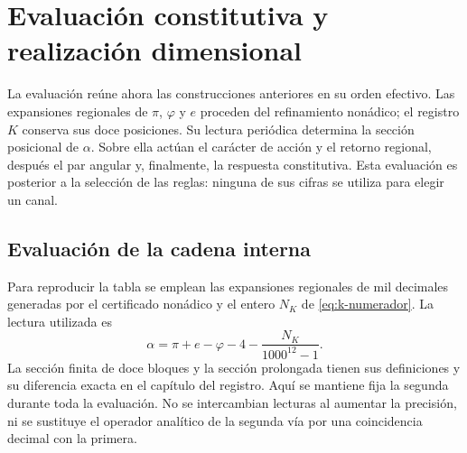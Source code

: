 \section{Evaluación constitutiva y realización dimensional}
\label{iii:sec:evaluacion}

La evaluación reúne ahora las construcciones anteriores en su orden efectivo.
Las expansiones regionales de $\pi$, $\varphi$ y $e$ proceden del refinamiento
nonádico; el registro $K$ conserva sus doce posiciones. Su lectura periódica
determina la sección posicional de $\alpha$. Sobre ella actúan el carácter
de acción y el retorno regional, después el par angular y, finalmente, la
respuesta constitutiva. Esta evaluación es posterior a la selección de las
reglas: ninguna de sus cifras se utiliza para elegir un canal.

\subsection{Evaluación de la cadena interna}

Para reproducir la tabla se emplean las expansiones regionales de mil
decimales generadas por el certificado nonádico y el entero $N_K$ de
\eqref{eq:k-numerador}. La lectura utilizada es
\[
 \alpha=\pi+e-\varphi-4-\frac{N_K}{1000^{12}-1}.
\]
La sección finita de doce bloques y la sección prolongada tienen sus
definiciones y su diferencia exacta en el capítulo del registro. Aquí se
mantiene fija la segunda durante toda la evaluación. No se intercambian
lecturas al aumentar la precisión, ni se sustituye el operador analítico
de la segunda vía por una coincidencia decimal con la primera.

